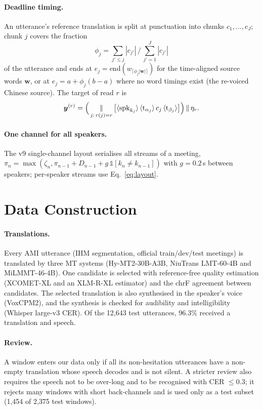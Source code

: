 \paragraph{Deadline timing.} An utterance's reference translation is split at punctuation into chunks $c_1,\dots,c_J$;
chunk $j$ covers the fraction
\begin{equation}
\phi_j=\textstyle\sum_{j'\le j}|c_{j'}|\,/\,\sum_{j'=1}^{J}|c_{j'}|
\label{eq:frac}
\end{equation}
of the utterance and ends at $e_j=\mathrm{end}(w_{\lceil\phi_j|\bm{w}|\rceil})$ for the time-aligned source words
$\bm{w}$, or at $e_j=a+\phi_j(b-a)$ where no word timings exist (the re-voiced Chinese source). The target of read $r$ is
\begin{equation}
\bm{y}^{(r)}=\Big(\mathop{\Vert}_{j:\,r(j)=r}\big[\langle\mathrm{spk}_{k_j}\rangle\,\langle\mathrm{t}_{\alpha_j}\rangle\,c_j\,\langle\mathrm{t}_{\beta_j}\rangle\big]\Big)\,\Vert\,\eta_r .
\label{eq:readtarget}
\end{equation}

\paragraph{One channel for all speakers.} The v9 single-channel layout serialises all streams of a meeting,
$\pi_n=\max(\zeta_n,\pi_{n-1}+D_{n-1}+g\,\mathds{1}[k_n\neq k_{n-1}])$ with $g=0.2$\,s between speakers; per-speaker
streams use Eq.~\eqref{eq:layout}.

\section{Data Construction}
\label{app:data}



\paragraph{Translations.} Every AMI utterance (IHM segmentation, official train/dev/test meetings) is translated by
three MT systems (Hy-MT2-30B-A3B, NiuTrans LMT-60-4B and MiLMMT-46-4B). One candidate is selected with reference-free
quality estimation (XCOMET-XL and an XLM-R-XL estimator) and the chrF agreement between candidates. The selected
translation is also synthesised in the speaker's voice (VoxCPM2), and the synthesis is checked for audibility and
intelligibility (Whisper large-v3 CER). Of the 12{,}643 test utterances, 96.3\% received a translation and speech.

\paragraph{Review.} A window enters our data only if all its non-hesitation utterances have a non-empty translation
whose speech decodes and is not silent. A stricter review also requires the speech not to be over-long and to be
recognised with CER $\le0.3$; it rejects many windows with short back-channels and is used only as a test subset
(1{,}454 of 2{,}375 test windows).

